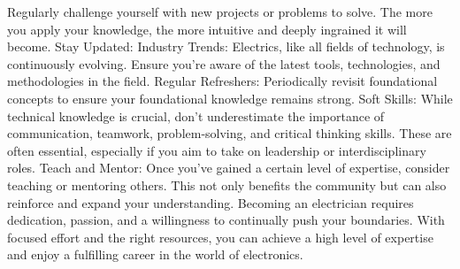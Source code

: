 {Regularly challenge yourself with new projects or problems to solve. The more you apply your knowledge, the more intuitive and deeply ingrained it will become.
Stay Updated:
Industry Trends: Electrics, like all fields of technology, is continuously evolving. Ensure you're aware of the latest tools, technologies, and methodologies in the field.
Regular Refreshers: Periodically revisit foundational concepts to ensure your foundational knowledge remains strong.
Soft Skills:
While technical knowledge is crucial, don't underestimate the importance of communication, teamwork, problem-solving, and critical thinking skills. These are often essential, especially if you aim to take on leadership or interdisciplinary roles.
Teach and Mentor:
Once you've gained a certain level of expertise, consider teaching or mentoring others. This not only benefits the community but can also reinforce and expand your understanding.
Becoming an electrician requires dedication, passion, and a willingness to continually push your boundaries. With focused effort and the right resources, you can achieve a high level of expertise and enjoy a fulfilling career in the world of electronics.
}
